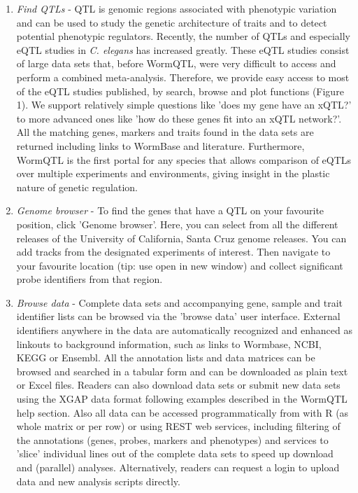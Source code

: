 \documentclass[8pt, twoside, a5paper]{report}
\newcommand{\italic}[1]{\textit{#1}}
\begin{document}
\begin{enumerate}\itemsep1pt
\item \italic{Find QTLs} - QTL is genomic regions associated with phenotypic variation and can be used to study the genetic architecture of 
traits and to detect potential phenotypic regulators. Recently, the number of QTLs and especially eQTL studies in \italic{C. elegans} has 
increased greatly. These eQTL studies consist of large data sets that, before WormQTL, were very difficult to access and perform a 
combined meta-analysis. Therefore, we provide easy access to most of the eQTL studies published, by search, browse and plot 
functions (Figure 1). We support relatively simple questions like 'does my gene have an xQTL?' to more advanced ones like 'how do 
these genes fit into an xQTL network?'. All the matching genes, markers and traits found in the data sets are returned including 
links to WormBase and literature. Furthermore, WormQTL is the first portal for any species that allows comparison of eQTLs over 
multiple experiments and environments, giving insight in the plastic nature of genetic regulation.

\item \italic{Genome browser} - To find the genes that have a QTL on your favourite position, click 'Genome browser'. Here, you can select 
from all the different releases of the University of California, Santa Cruz genome releases. You can add tracks from the designated 
experiments of interest. Then navigate to your favourite location (tip: use open in new window) and collect significant probe 
identifiers from that region.

\item \italic{Browse data} - Complete data sets and accompanying gene, sample and trait identifier lists can be browsed via the 'browse data' 
user interface. External identifiers anywhere in the data are automatically recognized and enhanced as linkouts to background 
information, such as links to Wormbase, NCBI, KEGG or Ensembl. All the annotation lists and data matrices can be browsed and searched 
in a tabular form and can be downloaded as plain text or Excel files. Readers can also download data sets or submit new data sets 
using the XGAP data format following examples described in the WormQTL help section. Also all data can be accessed programmatically 
from with R (as whole matrix or per row) or using REST web services, including filtering of the annotations (genes, probes, markers 
and phenotypes) and services to 'slice' individual lines out of the complete data sets to speed up download and (parallel) analyses. 
Alternatively, readers can request a login to upload data and new analysis scripts directly.
\end{enumerate}
\end{document}
